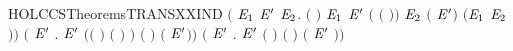 \begin{SaveVerbatim}{HOLCCSTheoremsTRANSXXIND}
       \ensuremath{(}\HOLSymConst{\HOLTokenForall{}}  \ensuremath{\HOLBoundVar{E}\sb{\mathrm{1}}} \ensuremath{\HOLBoundVar{E}\sp{\prime}} \ensuremath{\HOLBoundVar{E}\sb{\mathrm{2}}}.
              \ensuremath{(} \ensuremath{)} \ensuremath{\HOLBoundVar{E}\sb{\mathrm{1}}} \HOLSymConst{\HOLTokenConj{}}  \ensuremath{\HOLBoundVar{E}\sp{\prime}} \ensuremath{(} \ensuremath{(} \ensuremath{)}\ensuremath{)} \ensuremath{\HOLBoundVar{E}\sb{\mathrm{2}}} \HOLSymConst{\HOLTokenImp{}}
             \ensuremath{(} \HOLSymConst{\ensuremath{\mid}} \ensuremath{\HOLBoundVar{E}\sp{\prime}}\ensuremath{)} \HOLConst{\ensuremath{\tau}} \ensuremath{(}\ensuremath{\HOLBoundVar{E}\sb{\mathrm{1}}} \HOLSymConst{\ensuremath{\mid}} \ensuremath{\HOLBoundVar{E}\sb{\mathrm{2}}}\ensuremath{)}\ensuremath{)} \HOLSymConst{\HOLTokenConj{}}
       \ensuremath{(}\HOLSymConst{\HOLTokenForall{}}  \ensuremath{\HOLBoundVar{E}\sp{\prime}}  .
               \ensuremath{\HOLBoundVar{E}\sp{\prime}} \HOLSymConst{\HOLTokenConj{}}
            \ensuremath{(}\ensuremath{(} \HOLSymConst{\ensuremath{=}} \HOLConst{\ensuremath{\tau}}\ensuremath{)} \HOLSymConst{\HOLTokenDisj{}} \ensuremath{(} \HOLSymConst{\ensuremath{=}}  \ensuremath{)} \HOLSymConst{\HOLTokenConj{}}  \HOLConst{\HOLTokenNotIn{}}  \HOLSymConst{\HOLTokenConj{}}   \HOLConst{\HOLTokenNotIn{}} \ensuremath{)} \HOLSymConst{\HOLTokenImp{}}
             \ensuremath{(}  \ensuremath{)}  \ensuremath{(}  \ensuremath{\HOLBoundVar{E}\sp{\prime}}\ensuremath{)}\ensuremath{)} \HOLSymConst{\HOLTokenConj{}}
       \ensuremath{(}\HOLSymConst{\HOLTokenForall{}}  \ensuremath{\HOLBoundVar{E}\sp{\prime}} .
               \ensuremath{\HOLBoundVar{E}\sp{\prime}} \HOLSymConst{\HOLTokenImp{}}
             \ensuremath{(}  \ensuremath{)} \ensuremath{(}  \ensuremath{)} \ensuremath{(} \ensuremath{\HOLBoundVar{E}\sp{\prime}} \ensuremath{)}\ensuremath{)} \HOLSymConst{\HOLTokenConj{}}

\end{SaveVerbatim}
